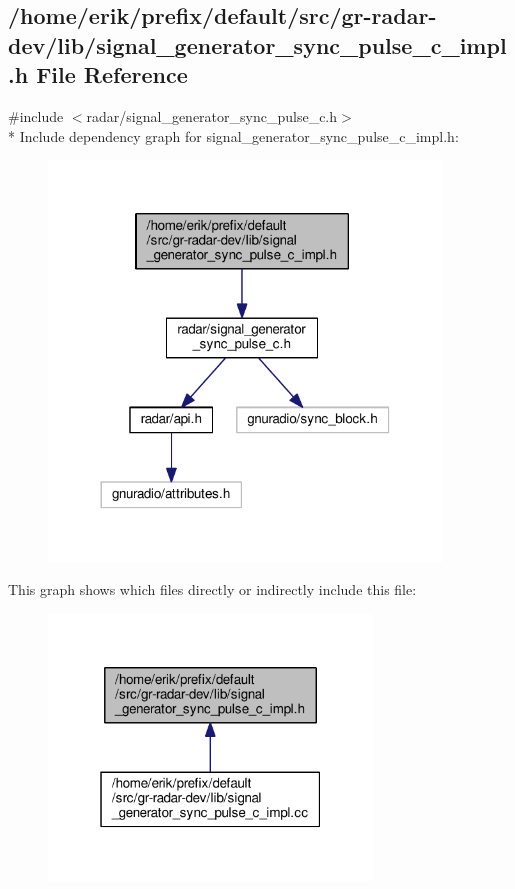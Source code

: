 \subsection{/home/erik/prefix/default/src/gr-\/radar-\/dev/lib/signal\+\_\+generator\+\_\+sync\+\_\+pulse\+\_\+c\+\_\+impl.h File Reference}
\label{signal__generator__sync__pulse__c__impl_8h}
{\ttfamily \#include $<$radar/signal\+\_\+generator\+\_\+sync\+\_\+pulse\+\_\+c.\+h$>$}\\*
Include dependency graph for signal\+\_\+generator\+\_\+sync\+\_\+pulse\+\_\+c\+\_\+impl.\+h\+:
\nopagebreak
\begin{figure}[H]
\begin{center}
\leavevmode
\includegraphics[width=296pt]{d6/d07/signal__generator__sync__pulse__c__impl_8h__incl}
\end{center}
\end{figure}
This graph shows which files directly or indirectly include this file\+:
\nopagebreak
\begin{figure}[H]
\begin{center}
\leavevmode
\includegraphics[width=244pt]{d7/da5/signal__generator__sync__pulse__c__impl_8h__dep__incl}
\end{center}
\end{figure}
